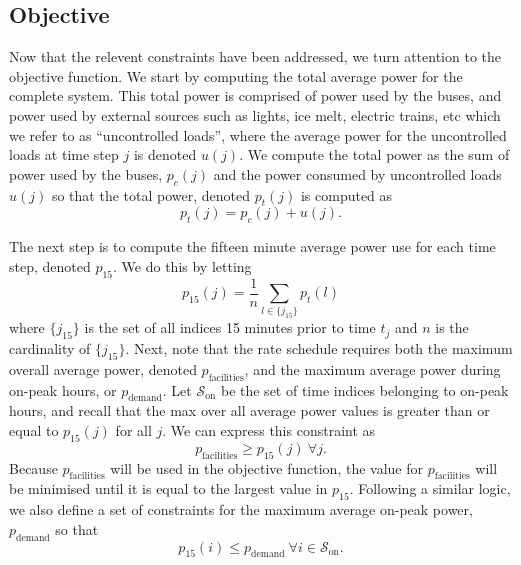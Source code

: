 \subsection{Objective\label{sec:objective}}
\par Now that the relevent constraints have been addressed, we turn attention to the objective function. We start by computing the total average power for the complete system. This total power is comprised of power used by the buses, and power used by external sources such as lights, ice melt, electric trains, etc which we refer to as ``uncontrolled loads'', where the average power for the uncontrolled loads at time step $j$ is denoted $u(j)$. We compute the total power as the sum of power used by the buses, $p_c(j)$ and the power consumed by uncontrolled loads $u(j)$ so that the total power, denoted $p_t(j)$ is computed as 
\begin{equation}\label{eqn:objective:pt}
	p_t(j) = p_c(j) + u(j).
\end{equation}
\par The next step is to compute the fifteen minute average power use for each time step, denoted $p_{\text{15}}$. We do this by letting 
\begin{equation}\label{eqn:objective:p15}
p_{\text{15}}(j) = \frac{1}{n}\sum_{l \in \{j_{15}\}}p_t(l)
\end{equation}
where $\{j_{15}\}$ is the set of all indices 15 minutes prior to time $t_j$ and $n$ is the cardinality of $\{j_{15}\}$.
Next, note that the rate schedule requires both the maximum overall average power, denoted $p_{\text{facilities}}$, and the maximum average power during on-peak hours, or $p_{\text{demand}}$. Let $\mathcal{S}_{\text{on}}$ be the set of time indices belonging to on-peak hours, and recall that the max over all average power values is greater than or equal to $p_{15}(j)$ for all $j$. We can express this constraint as
\begin{equation}\label{eqn:objective:pFac}
	p_{\text{facilities}} \ge p_{15}(j) \ \forall j.
\end{equation}
Because $p_{\text{facilities}}$ will be used in the objective function, the value for $p_{\text{facilities}}$ will be minimised until it is equal to the largest value in $p_{15}$. Following a similar logic, we also define a set of constraints for the maximum average on-peak power, $p_{\text{demand}}$ so that
\begin{equation}\label{eqn:objective:pDem}
	p_{15}(i) \leq p_{\text{demand}} \ \forall i \in \mathcal{S}_{\text{on}}.
\end{equation}

